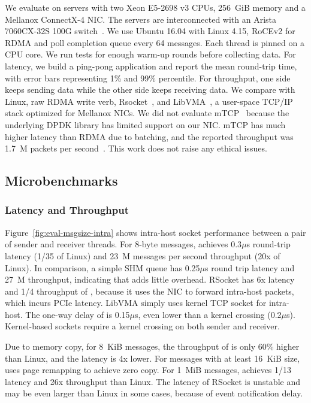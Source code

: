 We evaluate \sys on servers with two Xeon E5-2698 v3 CPUs, 256~GiB memory and a Mellanox ConnectX-4 NIC. The servers are interconnected with an Arista 7060CX-32S 100G switch~\cite{arista-7060cx}. We use Ubuntu 16.04 with Linux 4.15, RoCEv2 for RDMA and poll completion queue every 64 messages.
Each thread is pinned on a CPU core. We run tests for enough warm-up rounds before collecting data.
For latency, we build a ping-pong application and report the mean round-trip time, with error bars representing 1\% and 99\% percentile.
For throughput, one side keeps sending data while the other side keeps receiving data.
We compare with Linux, raw RDMA write verb, Rsocket~\cite{rsockets}, and LibVMA~\cite{libvma}, a user-space TCP/IP stack optimized for Mellanox NICs.
We did not evaluate mTCP~\cite{jeong2014mtcp} because the underlying DPDK library has limited support on our NIC. mTCP has much higher latency than RDMA due to batching, and the reported throughput was 1.7~M packets per second~\cite{kalia2018datacenter}. %
This work does not raise any ethical issues.

\subsection{Microbenchmarks}
\label{subsec:microbenchmark}

\subsubsection{Latency and Throughput}
\quad



Figure~\ref{fig:eval-msgsize-intra} shows intra-host socket performance between a pair of sender and receiver threads.
For 8-byte messages, \sys achieves 0.3$\mu$s round-trip latency (1/35 of Linux) and 23~M messages per second throughput (20x of Linux).
In comparison, a simple SHM queue has 0.25$\mu$s round trip latency and 27~M throughput, indicating that \sys adds little overhead.
RSocket has 6x latency and 1/4 throughput of \sys{}, because it uses the NIC to forward intra-host packets, which incurs PCIe latency.
LibVMA simply uses kernel TCP socket for intra-host.
The one-way delay of \sys{} is 0.15$\mu$s, even lower than a kernel crossing (0.2$\mu$s). Kernel-based sockets require a kernel crossing on both sender and receiver.

Due to memory copy, for 8~KiB messages, the throughput of \sys is only 60\% higher than Linux, and the latency is 4x lower. For messages with at least 16~KiB size, \sys uses page remapping to achieve zero copy.
For 1~MiB messages, \sys achieves 1/13 latency and 26x throughput than Linux.
The latency of RSocket is unstable and may be even larger than Linux in some cases, because of event notification delay.


